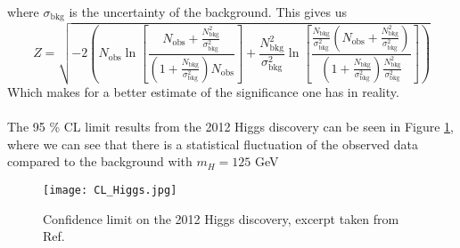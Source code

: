 \documentclass[12pt, a4paper]{book}
\begin{document}
where $\sigma_{\text{bkg}}$ is the uncertainty of the background. This gives us
\begin{equation}\label{eq:significance}
    Z = \sqrt{-2\left(N_{\text{obs}}\ln\left[\frac{N_{\text{obs}}+\frac{N_{\text{bkg}}^2}{\sigma_{\text{bkg}}^2} }{(1+\frac{N_{\text{bkg}}}{\sigma_{\text{bkg}}^2})N_{\text{obs}}}\right] + \frac{N_{\text{bkg}}^2}{\sigma_{\text{bkg}}^2} \ln\left[\frac{\frac{N_{\text{bkg}}}{\sigma_{\text{bkg}}^2}(N_{\text{obs}}+\frac{N_{\text{bkg}}^2}{\sigma_{\text{bkg}}^2} )}{(1+\frac{N_{\text{bkg}}}{\sigma_{\text{bkg}}^2})\frac{N_{\text{bkg}}^2}{\sigma_{\text{bkg}}^2}}\right]\right)}
\end{equation}
Which makes for a better estimate of the significance one has in reality.\\
\\The 95 \% CL limit results from the 2012 Higgs discovery \cite{Higgs_discovery_2012} can be seen in Figure \ref{fig:HIGGS_CL}, where we can see that there is a statistical fluctuation of the observed data compared to the background with $m_H=125$ GeV
\begin{figure}[!ht]
	\centering
    \texttt{[image: CL\_Higgs.jpg]}
    \caption[Confidence Limit on the Higgs discovery]{Confidence limit on the 2012 Higgs discovery, excerpt taken from Ref. \cite{Higgs_discovery_2012}}\label{fig:HIGGS_CL}
\end{figure}

\clearpage
\end{document}
